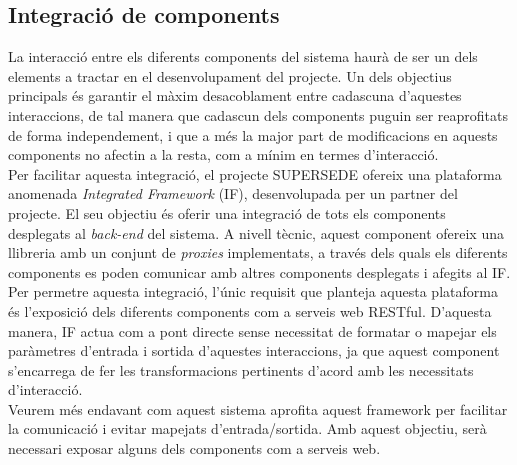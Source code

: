 \subsection{Integració de components}

La interacció entre els diferents components del sistema haurà de ser un dels elements a tractar en el desenvolupament del projecte. Un dels objectius principals és garantir el màxim desacoblament entre cadascuna d'aquestes interaccions, de tal manera que cadascun dels components puguin ser reaprofitats de forma independement, i que a més la major part de modificacions en aquests components no afectin a la resta, com a mínim en termes d'interacció.\\

Per facilitar aquesta integració, el projecte SUPERSEDE ofereix una plataforma anomenada \textit{Integrated Framework} (IF), desenvolupada per un partner del projecte. El seu objectiu és oferir una integració de tots els components desplegats al \textit{back-end} del sistema. A nivell tècnic, aquest component ofereix una llibreria amb un conjunt de \textit{proxies} implementats, a través dels quals els diferents components es poden comunicar amb altres components desplegats i afegits al IF.\\

Per permetre aquesta integració, l'únic requisit que planteja aquesta plataforma és l'exposició dels diferents components com a serveis web RESTful. D'aquesta manera, IF actua com a pont directe sense necessitat de formatar o mapejar els paràmetres d'entrada i sortida d'aquestes interaccions, ja que aquest component s'encarrega de fer les transformacions pertinents d'acord amb les necessitats d'interacció. \\

Veurem més endavant com aquest sistema aprofita aquest framework per facilitar la comunicació i evitar mapejats d'entrada/sortida. Amb aquest objectiu, serà necessari exposar alguns dels components com a serveis web.